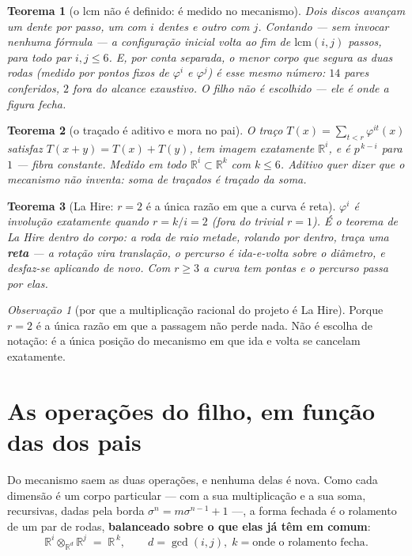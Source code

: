 \documentclass[11pt]{article}
\newcommand{\R}{\mathbb R}
\theoremstyle{plain}
\newtheorem{teorema}{Teorema}
\theoremstyle{remark}
\newtheorem{obs}{Observação}
\begin{document}
\begin{teorema}[o $\mathrm{lcm}$ não é definido: é medido no mecanismo]
Dois discos avançam um dente por passo, um com $i$ dentes e outro com $j$. Contando --- sem invocar
nenhuma fórmula --- a configuração inicial volta ao fim de $\mathrm{lcm}(i,j)$ passos, para todo par
$i,j\le6$. E, por conta separada, o menor corpo que segura as duas rodas (medido por pontos fixos de
$\varphi^i$ e $\varphi^j$) é esse mesmo número: $14$ pares conferidos, $2$ fora do alcance
exaustivo. \emph{O filho não é escolhido --- ele é onde a figura fecha.}
\end{teorema}

\begin{teorema}[o traçado é aditivo e mora no pai]
O traço $T(x)=\sum_{t<r}\varphi^{it}(x)$ satisfaz $T(x+y)=T(x)+T(y)$, tem imagem exatamente $\R^i$, e
é $p^{\,k-i}$ para $1$ --- fibra constante. Medido em todo $\R^i\subset\R^k$ com $k\le6$. Aditivo quer
dizer que o mecanismo \emph{não inventa}: soma de traçados é traçado da soma.
\end{teorema}

\begin{teorema}[La Hire: $r=2$ é a única razão em que a curva é reta]
$\varphi^i$ é involução exatamente quando $r=k/i=2$ (fora do trivial $r=1$). É o teorema de La Hire
dentro do corpo: a roda de raio metade, rolando por dentro, traça uma \textbf{reta} --- a rotação vira
translação, o percurso é ida-e-volta sobre o diâmetro, e desfaz-se aplicando de novo. Com $r\ge3$ a
curva tem pontas e o percurso passa por elas.
\end{teorema}

\begin{obs}[por que a multiplicação racional do projeto é La Hire]
Porque $r=2$ é a única razão em que a passagem não perde nada. Não é escolha de notação: é a única
posição do mecanismo em que ida e volta se cancelam exatamente.
\end{obs}

\section{As operações do filho, em função das dos pais}

Do mecanismo saem as duas operações, e nenhuma delas é nova. Como cada dimensão é um corpo particular
--- com a sua multiplicação e a sua soma, recursivas, dadas pela borda $\sigma^n=m\sigma^{n-1}+1$ ---,
a forma fechada é o rolamento de um par de rodas, \textbf{balanceado sobre o que elas já têm em
comum}:
\[
  \boxed{\;\R^i\otimes_{\R^d}\R^j \;=\; \R^{\,k},\qquad d=\gcd(i,j),\;
  k=\text{onde o rolamento fecha}.\;}
\]
\end{document}
